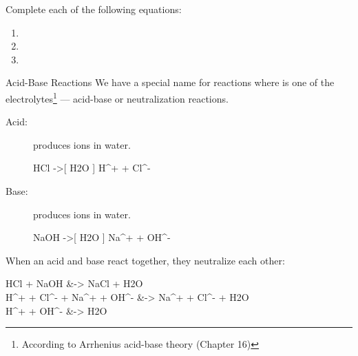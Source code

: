 \documentclass[notes=hide]{beamer}
\begin{document}
\begin{onyourown}[0em]
	Complete each of the following equations:

	\vspace{1em}

	\begin{enumerate}
		\item {}
			\vspace{2em}
		\item {}
			\vspace{2em}
		\item {}
			\vspace{2em}
	\end{enumerate}
\end{onyourown}

\begin{frame}{Acid-Base Reactions}
	We have a special name for reactions where  is one of the
	electrolytes\footnote{According to Arrhenius acid-base theory (Chapter 16)}
	--- \alert{acid-base} or \alert{neutralization}
	reactions.

	\begin{description}
		\item[Acid:] produces  ions in water.
			\begin{reaction*}
				HCl\aq{} ->[ H2O ] H^{+}\aq{} +
				Cl^{-}\aq{}
			\end{reaction*}
		\item[Base:] produces  ions in water.
			\begin{reaction*}
				NaOH\aq{} ->[ H2O ] Na^{+}\aq{} +
				OH^{-}\aq{}
			\end{reaction*}
	\end{description}

	When an acid and base react together, they \alert{neutralize} each other:
	{\small
	\begin{reactions*}
		HCl\aq{} + NaOH\aq{} &-> NaCl\aq{} + H2O\lqd{} \\
		H^{+}\aq{} + Cl^{-}\aq{} + Na^{+}\aq{} + OH^{-}\aq{} &->
		Na^{+}\aq{} + Cl^{-}\aq{} + H2O\lqd{} \\
		H^{+}\aq{} + OH^{-}\aq{} &-> H2O\lqd{} \\
	\end{reactions*}
}
\end{frame}
\end{document}
